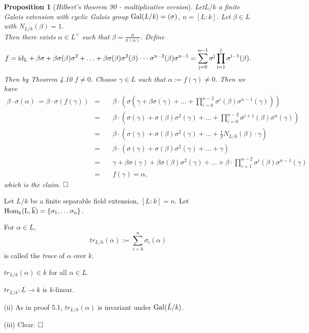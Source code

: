 \documentclass[11pt]{book}
\newtheorem{proposition}[theorem]{Proposition}
\theoremstyle{nonumberbreak}
\newenvironment{pr}[1][]{\ifthenelse{\equal{#1}{}}{\proof}{\proof[#1]}\rm}{\endproof}
\newenvironment{definbem}[1][]{\ifthenelse{\equal{#1}{}}{\definibem}{\definibem[#1]}\rm}{\enddefinibem}
\begin{document}
\begin{spacing}{1.3}
\begin{proposition}[\rm \it Hilbert's theorem 90 - multiplicative version]     %
Let$L/k$ a finite Galois extension with cyclic Galois group $\rm{Gal}\it(L/k)=( \sigma )$, $n=[L:k]$. Let $\beta \in L$ with $N_{L/k}(\beta)=1$.\\
Then there exists $\alpha \in L^{\times}$ such that $\beta= \frac{\alpha}{\sigma(\alpha)}$.
\begin{pr}
Define
$$f=\rm{id}_{L}+\beta  \sigma+ \beta  \sigma(\beta) \sigma^2 + \ldots + \beta  \sigma(\beta)  \sigma^2(\beta) \cdot \cdot \cdot \sigma^{n-2}(\beta) \sigma^{n-1}=\sum_{j=0}^{n-1} \sigma^j  \prod_{i=1}^j \sigma^{i-1}(\beta).$$
Then by Theorem 4.10 $f\neq 0$. Choose $\gamma \in L$ such that $\alpha:=f(\gamma)\neq 0$. Then we have
\allowdisplaybreaks[1]
\begin{alignat*}{7}
\beta \cdot \sigma(\alpha)\ = \beta \cdot \sigma \left(f(\gamma)\right)&=&&\ \beta \cdot \left(\sigma\left(\gamma+ \beta \sigma(\gamma) + \ldots + \prod_{i=0 }^{n-2} \sigma^{i}(\beta) \sigma^{n-1}(\gamma)\right)\right)\\
&=&& \ \beta \cdot \left(\sigma(\gamma)+\sigma(\beta) \sigma^2(\gamma) + \ldots + \prod_{i=0}^{n-2} \sigma^{i+1}(\beta) \sigma^n(\gamma)\right)\\
&=&& \ \beta \cdot \left(\sigma(\gamma)+\sigma(\beta) \sigma^2(\gamma) + \ldots +  \frac{1}{\beta} N_{L/k}(\beta) \cdot \gamma\right)\\
&=&&\ \beta \cdot \left(\sigma(\gamma)+\sigma(\beta) \sigma^2(\gamma) + \ldots + \gamma\right)\\
&=&&\ \gamma+ \beta \sigma(\gamma)+ \beta \sigma(\beta) \sigma^2(\gamma)+ \ldots + \beta \cdot \prod_{i=1}^{n-2} \sigma^{i}(\beta) \sigma^{n-1}(\gamma)\\
&=&&\ f(\gamma)=\alpha,
\end{alignat*}
which is the claim. $\hfill \Box$
\end{pr}
\end{proposition}

\begin{definbem}%
Let $L/k$ be a finite separable field extension, $[L:k]=n$. Let $\rm{Hom}_{k}(L,\overline{k})=\{\sigma_1, \dots \sigma_n\}$.
\begin{compactenum}
\item For $\alpha \in L$, 
$$tr_{L/k}(\alpha):=\sum_{i=0}^n \sigma_i(\alpha)$$
is called the \textit{trace} of $\alpha$ over $k$.
\item $tr_{L/k}(\alpha) \in k$ for all $\alpha \in L$.
\item $tr_{L/k}: L \longrightarrow k$ is $k$-linear.
\end{compactenum}
\begin{pr}
\begin{compactenum}
\item[(ii)] As in proof 5.1, $tr_{L/k}(\alpha)$ is invariant under $\rm{Gal}\it(\tilde{L}/k)$.
\item[(iii)] Clear. $\hfill \Box$
\end{compactenum}
\end{pr}
\end{definbem}


\end{spacing}
\end{document}
